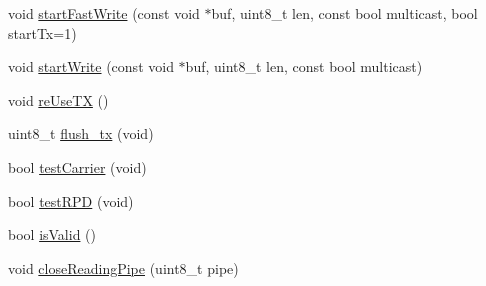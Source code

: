 \begin{DoxyCompactItemize}
\item 
void \hyperlink{classRF24_acd19843064cb70ec23507412e519e4ef}{start\+Fast\+Write} (const void $\ast$buf, uint8\+\_\+t len, const bool multicast, bool start\+Tx=1)
\item 
void \hyperlink{classRF24_aa27519fc289920094422033e0bbf8cf9}{start\+Write} (const void $\ast$buf, uint8\+\_\+t len, const bool multicast)
\item 
void \hyperlink{classRF24_aeaf7fa54d3ab2a85ce215b4bf6ae933b}{re\+Use\+TX} ()
\item 
uint8\+\_\+t \hyperlink{classRF24_adb7915b1d2661a82137573344f659e81}{flush\+\_\+tx} (void)
\item 
bool \hyperlink{classRF24_ad0d522ccf39493510e64bf1740be790d}{test\+Carrier} (void)
\item 
bool \hyperlink{classRF24_a821285f3b54553f4402eb3fd0ac6d6c1}{test\+R\+PD} (void)
\item 
bool \hyperlink{classRF24_a35e5f1533b7753806c42b76e782d917e}{is\+Valid} ()
\item 
void \hyperlink{classRF24_a9944d93994a80037e3586f340f5e0107}{close\+Reading\+Pipe} (uint8\+\_\+t pipe)
\end{DoxyCompactItemize}
